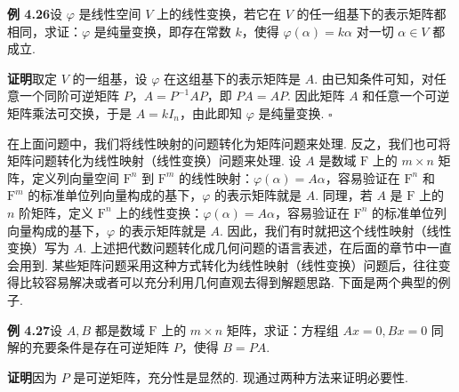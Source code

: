 \documentclass[UTF8, 12pt, fontset=fandol, oneside]{ctexart}
\begin{document}
\noindent\textbf{例 4.26}\quad 设 $\varphi$ 是线性空间 $V$ 上的线性变换，若它在 $V$ 的任一组基下的表示矩阵都相同，求证：$\varphi$ 是纯量变换，即存在常数 $k$，使得 $\varphi(\alpha)=k\alpha$ 对一切 $\alpha\in V$ 都成立.

\noindent\textbf{证明}\quad 取定 $V$ 的一组基，设 $\varphi$ 在这组基下的表示矩阵是 $A$. 由已知条件可知，对任意一个同阶可逆矩阵 $P$，$A=P^{-1}AP$，即 $PA=AP$. 因此矩阵 $A$ 和任意一个可逆矩阵乘法可交换，于是 $A=kI_n$，由此即知 $\varphi$ 是纯量变换. $\square$

在上面问题中，我们将线性映射的问题转化为矩阵问题来处理. 反之，我们也可将矩阵问题转化为线性映射（线性变换）问题来处理. 设 $A$ 是数域 $\mathrm{F}$ 上的 $m\times n$ 矩阵，定义列向量空间 $\mathrm{F}^n$ 到 $\mathrm{F}^m$ 的线性映射：$\varphi(\alpha)=A\alpha$，容易验证在 $\mathrm{F}^n$ 和 $\mathrm{F}^m$ 的标准单位列向量构成的基下，$\varphi$ 的表示矩阵就是 $A$. 同理，若 $A$ 是 $\mathrm{F}$ 上的 $n$ 阶矩阵，定义 $\mathrm{F}^n$ 上的线性变换：$\varphi(\alpha)=A\alpha$，容易验证在 $\mathrm{F}^n$ 的标准单位列向量构成的基下，$\varphi$ 的表示矩阵就是 $A$. 因此，我们有时就把这个线性映射（线性变换）写为 $A$. 上述把代数问题转化成几何问题的语言表述，在后面的章节中一直会用到. 某些矩阵问题采用这种方式转化为线性映射（线性变换）问题后，往往变得比较容易解决或者可以充分利用几何直观去得到解题思路. 下面是两个典型的例子.

\noindent\textbf{例 4.27}\quad 设 $A,B$ 都是数域 $\mathrm{F}$ 上的 $m\times n$ 矩阵，求证：方程组 $Ax=0,Bx=0$ 同解的充要条件是存在可逆矩阵 $P$，使得 $B=PA$.

\noindent\textbf{证明}\quad 因为 $P$ 是可逆矩阵，充分性是显然的. 现通过两种方法来证明必要性.
\end{document}
